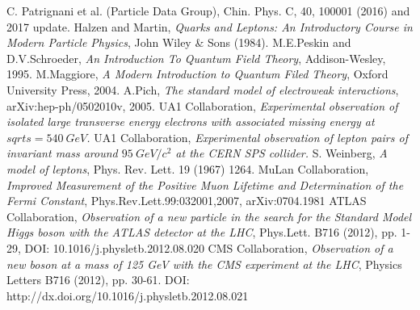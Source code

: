 \begin{thebibliography}{999}

		 C. Patrignani et al. (Particle Data Group), Chin. Phys. C, 40, 100001 (2016) and 2017 update.
		 Halzen and Martin, \emph{Quarks and Leptons: An Introductory Course in Modern Particle Physics}, John Wiley \& Sons (1984).
		 M.E.Peskin and D.V.Schroeder, \emph{An Introduction To Quantum Field Theory}, Addison-Wesley, 1995.
		 M.Maggiore, \emph{A Modern Introduction to Quantum Filed Theory}, Oxford University Press, 2004.
		 A.Pich, \emph{The standard model of electroweak interactions}, arXiv:hep-ph/0502010v,  2005.
		  UA1 Collaboration, \emph{Experimental observation of isolated large transverse energy electrons with associated missing energy at $sqrt{s}=540~GeV$.}
		 UA1 Collaboration, \emph{Experimental observation of lepton pairs of invariant mass around $95~GeV/c^{2}$ at the CERN SPS collider.}
		 S. Weinberg, \emph{A model of leptons}, Phys. Rev. Lett. 19 (1967) 1264.
		 MuLan Collaboration, \emph{Improved Measurement of the Positive Muon Lifetime and Determination of the Fermi Constant}, Phys.Rev.Lett.99:032001,2007, 	arXiv:0704.1981
		 ATLAS Collaboration, \emph{Observation of a new particle in the search for the Standard Model Higgs boson with the ATLAS detector at the LHC},  Phys.Lett. B716 (2012), pp. 1-29, DOI: 	10.1016/j.physletb.2012.08.020
		 CMS Collaboration, \emph{Observation of a new boson at a mass of 125 GeV with the CMS experiment at the LHC}, Physics Letters B716 (2012), pp. 30-61. DOI:   http://dx.doi.org/10.1016/j.physletb.2012.08.021 

		

				
           	  
	 
	 \end{thebibliography}
\clearpage{\pagestyle{empty}\cleardoublepage}